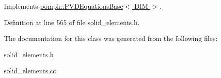 Implements \hyperlink{classoomph_1_1PVDEquationsBase_abd9064a8651728806dda27636b1e5b50}{oomph\+::\+P\+V\+D\+Equations\+Base$<$ D\+I\+M $>$}.



Definition at line 565 of file solid\+\_\+elements.\+h.



The documentation for this class was generated from the following files\+:\begin{DoxyCompactItemize}
\item 
\hyperlink{solid__elements_8h}{solid\+\_\+elements.\+h}\item 
\hyperlink{solid__elements_8cc}{solid\+\_\+elements.\+cc}\end{DoxyCompactItemize}
